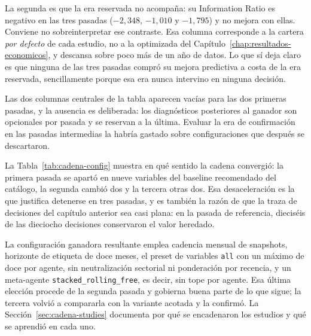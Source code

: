 La segunda es que la era reservada no acompaña: su Information Ratio es negativo en las tres pasadas
($-2{,}348$, $-1{,}010$ y $-1{,}795$) y no mejora con ellas. Conviene no sobreinterpretar ese
contraste. Esa columna corresponde a la cartera \emph{por defecto} de cada estudio, no a la
optimizada del Capítulo~\ref{chap:resultados-economicos}, y descansa sobre poco más de un año de
datos. Lo que sí deja claro es que ninguna de las tres pasadas compró su mejora predictiva a costa de
la era reservada, sencillamente porque esa era nunca intervino en ninguna decisión.

Las dos columnas centrales de la tabla aparecen vacías para las dos primeras pasadas, y la ausencia
es deliberada: los diagnósticos posteriores al ganador son opcionales por pasada y se reservan a la
última. Evaluar la era de confirmación en las pasadas intermedias la habría gastado sobre
configuraciones que después se descartaron.

\begin{table}[H]
  \centering
  \small
  \caption{Qué cambió cada pasada respecto de su punto de partida.}
  \label{tab:cadena-config}
  
  \caption*{Cada pasada se compara con su configuración de partida. El Anexo~\ref{anexo:catalogo}
  reproduce el catálogo completo con el valor final de las treinta y tres variables.}
\end{table}

La Tabla~\ref{tab:cadena-config} muestra en qué sentido la cadena convergió: la primera pasada se
apartó en nueve variables del baseline recomendado del catálogo, la segunda cambió dos y la tercera
otras dos. Esa desaceleración es la que justifica detenerse en tres pasadas, y es también la razón de
que la traza de decisiones del capítulo anterior sea casi plana: en la pasada de referencia,
dieciséis de las dieciocho decisiones conservaron el valor heredado.

La configuración ganadora resultante emplea cadencia mensual de snapshots, horizonte de etiqueta de
doce meses, el preset de variables \texttt{all} con un máximo de doce por agente, sin neutralización
sectorial ni ponderación por recencia, y un meta-agente \texttt{stacked\_rolling\_free}, es decir,
sin tope por agente. Esa última elección procede de la segunda pasada y gobierna buena parte de lo
que sigue; la tercera volvió a compararla con la variante acotada y la confirmó. La
Sección~\ref{sec:cadena-studies} documenta por qué se encadenaron los estudios y qué se aprendió en
cada uno.

